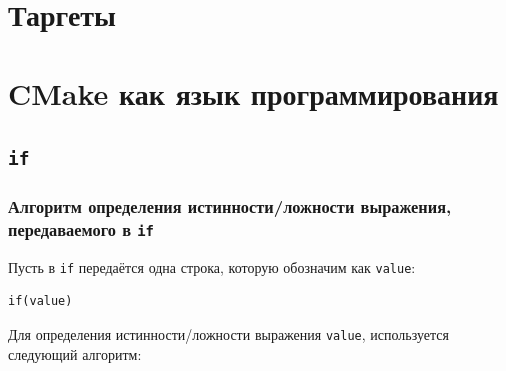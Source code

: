 \documentclass{article}
\begin{document}
\section{Таргеты}


\section{CMake как язык программирования}

\subsection*{\texttt{if}}



\subsubsection*{Алгоритм определения истинности/ложности выражения, передаваемого в \texttt{if}}
Пусть в \texttt{if} передаётся одна строка, которую обозначим как \texttt{value}:
\begin{verbatim}
if(value)
\end{verbatim}
Для определения истинности/ложности выражения \texttt{value}, используется следующий алгоритм:
\end{document}
